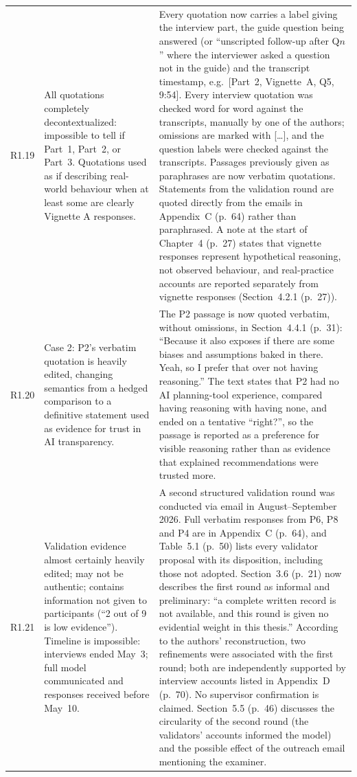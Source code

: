 \documentclass[12pt,a4paper,twoside]{article}
\begin{document}
{\begin{longtable}{p{1cm}p{6.7cm}p{7cm}}
R1.19 &
All quotations completely decontextualized: impossible to tell if Part~1, Part~2, or
Part~3. Quotations used as if describing real-world behaviour when at least some are
clearly Vignette A responses. &
Every quotation now carries a label giving the interview part, the guide question being answered (or ``unscripted follow-up after Q$n$'' where the interviewer asked a question not in the guide) and the transcript timestamp, e.g.\ [Part~2, Vignette~A, Q5, 9:54]. Every interview quotation was checked word for word against the transcripts, manually by one of the authors; omissions are marked with {[}\ldots{]}, and the question labels were checked against the transcripts. Passages previously given as paraphrases are now verbatim quotations. Statements from the validation round are quoted directly from the emails in Appendix~C (p.~64) rather than paraphrased. A note at the start of Chapter~4 (p.~27) states that vignette responses represent hypothetical reasoning, not observed behaviour, and real-practice accounts are reported separately from vignette responses (Section~4.2.1 (p.~27)). \\

R1.20 &
Case 2: P2's verbatim quotation is heavily edited, changing semantics from a hedged
comparison to a definitive statement used as evidence for trust in AI transparency. &
The P2 passage is now quoted verbatim, without omissions, in Section~4.4.1 (p.~31): ``Because it also exposes if there are some biases and assumptions baked in there. Yeah, so I prefer that over not having reasoning.'' The text states that P2 had no AI planning-tool experience, compared having reasoning with having none, and ended on a tentative ``right?'', so the passage is reported as a preference for visible reasoning rather than as evidence that explained recommendations were trusted more. \\

R1.21 &
Validation evidence almost certainly heavily edited; may not be authentic; contains
information not given to participants (``2 out of 9 is low evidence''). Timeline is
impossible: interviews ended May~3; full model communicated and responses received
before May~10. &
A second structured validation round was conducted via email in August--September 2026. Full verbatim responses from P6, P8 and P4 are in Appendix~C (p.~64), and Table~5.1 (p.~50) lists every validator proposal with its disposition, including those not adopted. Section~3.6 (p.~21) now describes the first round as informal and preliminary: ``a complete written record is not available, and this round is given no evidential weight in this thesis.'' According to the authors' reconstruction, two refinements were associated with the first round; both are independently supported by interview accounts listed in Appendix~D (p.~70). No supervisor confirmation is claimed. Section~5.5 (p.~46) discusses the circularity of the second round (the validators' accounts informed the model) and the possible effect of the outreach email mentioning the examiner. \\


\end{longtable}}
\end{document}
